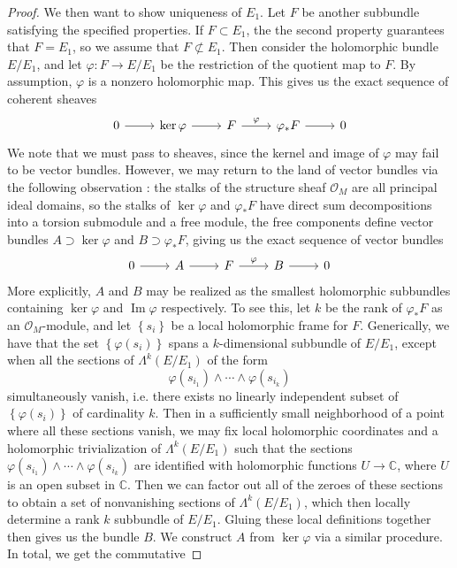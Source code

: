 \documentclass[psamsfonts, 12pt]{amsart}
\theoremstyle{definition}
\theoremstyle{remark}
\renewcommand{\O}{\mathcal{O}}
\newcommand{\C}{\mathbb{C}}
\newcommand{\set}[1]{\left\lbrace #1 \right\rbrace}
\DeclareMathOperator{\im}{Im}
\begin{document}
\begin{proof}
We then want to show uniqueness of $E_1$. Let $F$ be another subbundle satisfying the
specified properties. If $F \subset E_1$, the the second property guarantees that
$F = E_1$, so we assume that $F \not\subset E_1$. Then consider the holomorphic
bundle $E/E_1$, and let $\varphi : F \to E/E_1$ be the restriction of the quotient
map to $F$. By assumption, $\varphi$ is a nonzero holomorphic map. This
gives us the exact sequence of coherent sheaves
\[\begin{tikzcd}
0 \ar[r] & \ker\varphi \ar[r] & F \ar[r,"\varphi"] & \varphi_*F \ar[r] & 0
\end{tikzcd}\]
We note that we must pass to sheaves, since the kernel and image of $\varphi$ may
fail to be vector bundles. However, we may return to the land of vector bundles
via the following observation : the stalks of the structure sheaf $\O_M$ are all
principal ideal domains, so the stalks of $\ker\varphi$ and $\varphi_*F$ have
direct sum decompositions into a torsion submodule and a free module, the
free components define vector bundles $A \supset \ker\varphi$ and
$B \supset \varphi_*F$, giving us the exact sequence of vector bundles
\[\begin{tikzcd}
0 \ar[r] & A \ar[r] & F \ar[r, "\varphi"] & B \ar[r] & 0
\end{tikzcd}\]
More explicitly, $A$ and $B$ may be realized as the smallest holomorphic subbundles
containing $\ker\varphi$ and $\im\varphi$ respectively. To see this,
let $k$ be the rank of $\varphi_*F$ as an $\O_M$-module, and let $\set{s_i}$ be
a local holomorphic frame for $F$. Generically, we have that the set
$\set{\varphi(s_i)}$ spans a $k$-dimensional subbundle of $E/E_1$, except when
all the sections of $\Lambda^k(E/E_1)$ of the form
\[
\varphi(s_{i_1}) \wedge \cdots \wedge \varphi(s_{i_k})
\]
simultaneously vanish, i.e. there exists no linearly independent subset of
$\set{\varphi(s_i)}$ of cardinality $k$. Then in a sufficiently small neighborhood
of a point where all these sections vanish, we may fix local holomorphic coordinates
and a holomorphic trivialization of $\Lambda^k(E/E_1)$ such that the sections
$\varphi(s_{i_1})\wedge\cdots\wedge\varphi(s_{i_k})$ are identified with holomorphic
functions $U \to \C$, where $U$ is an open subset in $\C$. Then we can factor out
all of the zeroes of these sections to obtain a set of nonvanishing sections of
$\Lambda^k(E/E_1)$, which then locally determine a rank $k$ subbundle of $E/E_1$.
Gluing these local definitions together then gives us the bundle $B$. We construct
$A$ from $\ker\varphi$ via a similar procedure. In total, we get the commutative

\end{proof}
\end{document}
